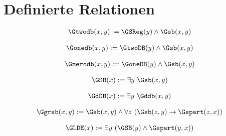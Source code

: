 \section{Definierte Relationen}

\begin{erin}
    \begin{align*}
        \Gtwodb(x,y) := \GSReg(y) \wedge \Gsb(x,y)
    \end{align*}
\end{erin}

\begin{erin}
    \begin{align*}
        \Gonedb(x,y) := \GtwoDB(y) \wedge \Gsb(x,y)
    \end{align*}
\end{erin}

\begin{erin}
    \begin{align*}
        \Gzerodb(x,y) := \GoneDB(y) \wedge \Gsb(x,y)
    \end{align*}
\end{erin}

\begin{erin}
    \begin{align*}
        \GSB(x) := \exists y\ \Gsb(x,y)
    \end{align*}
\end{erin}

\begin{erin}
    \begin{align*}
        \GdDB(x) := \exists y\ \Gddb(x, y)
    \end{align*}
\end{erin}

\begin{erin}
    \begin{align*}
        \Ggrsb(x,y) := \Gsb(x,y) \wedge \forall z\ (\Gsb(z,y) \to \Gspart(z,x))
    \end{align*}
\end{erin}
 
\begin{erin}
    \begin{align*}
        \GLDE(x) := \exists y\ (\GSB(y) \wedge \Gspart(y, x))
    \end{align*}
\end{erin}

